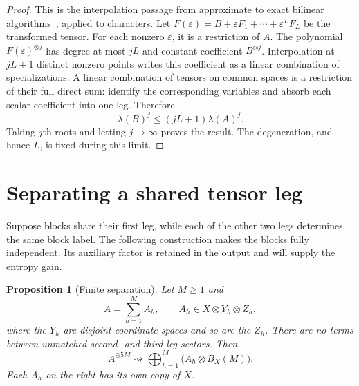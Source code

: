 \documentclass[11pt]{article}
\newtheorem{proposition}[theorem]{Proposition}
\theoremstyle{definition}
\theoremstyle{remark}
\newcommand{\degen}{\mathrel{\rightsquigarrow}}
\newcommand{\eps}{\varepsilon}
\numberwithin{equation}{section}
\begin{document}
\begin{proof}
This is the interpolation passage from approximate to exact bilinear
algorithms~\cite{Bini80}, applied to characters. Let
$F(\eps)=B+\eps F_1+\cdots+\eps^L F_L$ be the transformed tensor.
For each nonzero $\eps$, it is a restriction of $A$. The polynomial
$F(\eps)^{\otimes j}$ has degree at most $jL$ and constant coefficient
$B^{\otimes j}$. Interpolation at $jL+1$ distinct nonzero points writes
this coefficient as a linear combination of specializations.
A linear combination of tensors on common spaces is a restriction of
their full direct sum: identify the corresponding variables and absorb
each scalar coefficient into one leg. Therefore
\[
 \lambda(B)^j\leq(jL+1)\lambda(A)^j.
\]
Taking $j$th roots and letting $j\to\infty$ proves the result.
The degeneration, and hence $L$, is fixed during this limit.
\end{proof}

\section{Separating a shared tensor leg}\label{sec:separation}

Suppose blocks share their first leg, while each of the other two legs
determines the same block label. The following construction makes the
blocks fully independent. Its auxiliary factor is retained in the
output and will supply the entropy gain.

\begin{proposition}[Finite separation]\label{prop:separation}
Let $M\geq1$ and
\[
 A=\sum_{h=1}^M A_h,\qquad A_h\in X\otimes Y_h\otimes Z_h,
\]
where the $Y_h$ are disjoint coordinate spaces and so are the $Z_h$.
There are no terms between unmatched second- and third-leg sectors.
Then
\begin{equation}\label{eq:finite-separation}
 A^{\oplus5M}\degen
 \bigoplus_{h=1}^M\bigl(A_h\otimes B_X(M)\bigr).
\end{equation}
Each $A_h$ on the right has its own copy of $X$.
\end{proposition}
\end{document}
